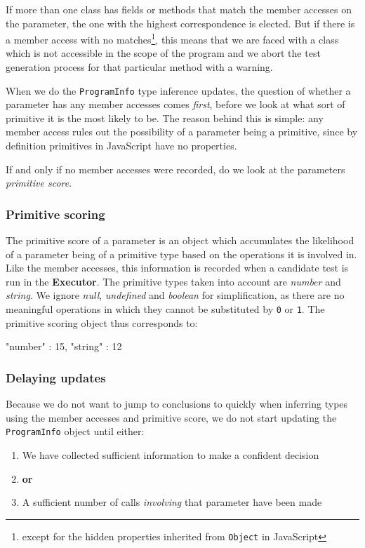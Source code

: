 If more than one class has fields or methods that match the member accesses on the parameter, the one with the highest correspondence is elected. But if there is a member access with no matches\footnote{except for the hidden properties inherited from \texttt{Object} in JavaScript}, this means that we are faced with a class which is not accessible in the scope of the program and we abort the test generation process for that particular method with a warning.

When we do the \texttt{ProgramInfo} type inference updates, the question of whether a parameter has any member accesses comes \emph{first}, before we look at what sort of primitive it is the most likely to be. The reason behind this is simple: any member access rules out the possibility of a parameter being a primitive, since by definition primitives in JavaScript have no properties.

If and only if no member accesses were recorded, do we look at the parameters \emph{primitive score}.

\subsubsection{Primitive scoring}
The primitive score of a parameter is an object which accumulates the likelihood of a parameter being of a primitive type based on the operations it is involved in. Like the member accesses, this information is recorded when a candidate test is run in the \textbf{Executor}. The primitive types taken into account are \emph{number} and \emph{string}. We ignore \emph{null}, \emph{undefined} and \emph{boolean} for simplification, as there are no meaningful operations in which they cannot be substituted by \texttt{0} or \texttt{1}. The primitive scoring object thus corresponds to:

\begin{verbcode}
   {
      "number" : 15,
      "string" : 12
   }
\end{verbcode}

\subsubsection{Delaying updates}
Because we do not want to jump to conclusions to quickly when inferring types using the member accesses and primitive score, we do not start updating the \texttt{ProgramInfo} object until either:

\begin{enumerate}
   \item We have collected sufficient information to make a confident decision
   \item[] \textbf{or}
   \item A sufficient number of calls \emph{involving} that parameter have been made
\end{enumerate}

